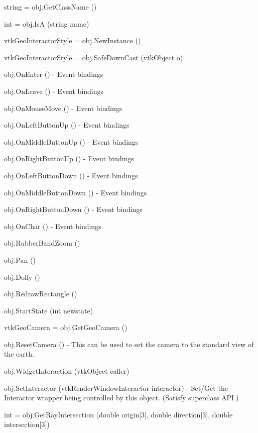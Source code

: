 \begin{DoxyItemize}
\item {\ttfamily string = obj.\-Get\-Class\-Name ()}  
\item {\ttfamily int = obj.\-Is\-A (string name)}  
\item {\ttfamily vtk\-Geo\-Interactor\-Style = obj.\-New\-Instance ()}  
\item {\ttfamily vtk\-Geo\-Interactor\-Style = obj.\-Safe\-Down\-Cast (vtk\-Object o)}  
\item {\ttfamily obj.\-On\-Enter ()} -\/ Event bindings  
\item {\ttfamily obj.\-On\-Leave ()} -\/ Event bindings  
\item {\ttfamily obj.\-On\-Mouse\-Move ()} -\/ Event bindings  
\item {\ttfamily obj.\-On\-Left\-Button\-Up ()} -\/ Event bindings  
\item {\ttfamily obj.\-On\-Middle\-Button\-Up ()} -\/ Event bindings  
\item {\ttfamily obj.\-On\-Right\-Button\-Up ()} -\/ Event bindings  
\item {\ttfamily obj.\-On\-Left\-Button\-Down ()} -\/ Event bindings  
\item {\ttfamily obj.\-On\-Middle\-Button\-Down ()} -\/ Event bindings  
\item {\ttfamily obj.\-On\-Right\-Button\-Down ()} -\/ Event bindings  
\item {\ttfamily obj.\-On\-Char ()} -\/ Event bindings  
\item {\ttfamily obj.\-Rubber\-Band\-Zoom ()}  
\item {\ttfamily obj.\-Pan ()}  
\item {\ttfamily obj.\-Dolly ()}  
\item {\ttfamily obj.\-Redraw\-Rectangle ()}  
\item {\ttfamily obj.\-Start\-State (int newstate)}  
\item {\ttfamily vtk\-Geo\-Camera = obj.\-Get\-Geo\-Camera ()}  
\item {\ttfamily obj.\-Reset\-Camera ()} -\/ This can be used to set the camera to the standard view of the earth.  
\item {\ttfamily obj.\-Widget\-Interaction (vtk\-Object caller)}  
\item {\ttfamily obj.\-Set\-Interactor (vtk\-Render\-Window\-Interactor interactor)} -\/ Set/\-Get the Interactor wrapper being controlled by this object. (Satisfy superclass A\-P\-I.)  
\item {\ttfamily int = obj.\-Get\-Ray\-Intersection (double origin\mbox{[}3\mbox{]}, double direction\mbox{[}3\mbox{]}, double intersection\mbox{[}3\mbox{]})}  

\end{DoxyItemize}
